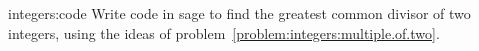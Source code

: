 \begin{problem}{integers:code}
Write code in sage to find the greatest common divisor of two integers, using the ideas of problem~\vref{problem:integers:multiple.of.two}.
\end{problem}
%
